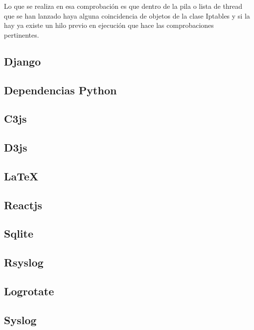 Lo que se realiza en esa comprobación es que dentro de la pila o lista de thread que se han lanzado haya alguna coincidencia de objetos de la clase Iptables y si la hay ya existe un hilo previo en ejecución que hace las comprobaciones pertinentes.\\
\newpage


\subsection{Django}

\subsection{Dependencias Python}

\subsection{C3js}

\subsection{D3js}

\subsection{\LaTeX}

\subsection{Reactjs}

\subsection{Sqlite}

\subsection{Rsyslog}

\subsection{Logrotate}

\subsection{Syslog}

